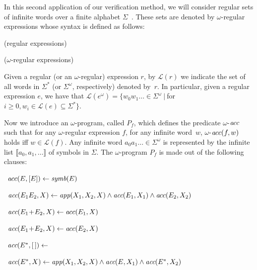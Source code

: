 \documentclass[english]{tlp}
\newcommand{\Mathit}[1]{\mbox{\it #1}}
\begin{document}
\begin{example}

In this second application of our verification method, we will consider
regular sets of infinite words over a finite alphabet $\Sigma$~\cite{Tho90}. 
These sets are
denoted by $\omega$-regular expressions whose syntax is defined as follows: 

\smallskip
{}(regular expressions)

\smallskip
{}($\omega$-regular expressions)

\smallskip
\noindent Given a regular (or an $\omega$-regular) expression $r$,
by $\mathcal L(r)$ we indicate the set of all words in $\Sigma^*$ 
(or $\Sigma^\omega$, respectively) denoted by~$r$.
In particular, given a regular expression $e$, we have that
$\mathcal L(e^\omega)=\{w_0w_1\ldots\in\Sigma^\omega\ |\ $for~$i\!\geq\! 0,
w_i\in\mathcal L(e)\!\subseteq\! \Sigma^*\}$.

Now we introduce an $\omega$-program, called
$P_f$, which defines the predicate $\omega$-${\Mathit acc}$ such
that for any $\omega$-regular expression $f$, for any infinite word~$w$,
\mbox{$\omega$-${\Mathit acc}(f,w)$} holds iff $w\in \mathcal L(f)$.
Any infinite word $a_0a_1\ldots\in\Sigma^\omega$ is represented by the infinite
list  $\llbracket a_0,a_1,\ldots\rrbracket$ of symbols in $\Sigma$. 
The $\omega$-program $P_f$ is made out of the following clauses:

\smallskip



~${\Mathit acc}(E,[E])\leftarrow
\Mathit{symb}(E)$

~${\Mathit{acc}}(E_1E_2,X) \leftarrow
\Mathit{app}(X_1,X_2,X)\wedge {\Mathit{acc}}(E_1,X_1)\wedge {\Mathit
acc}(E_2,X_2)$

~${\Mathit{acc}}(E_1\!+\!E_2,X) \leftarrow
{\Mathit acc}(E_1,X)$

~${\Mathit{acc}}(E_1\!+\!E_2,X) \leftarrow
{\Mathit acc}(E_2,X)$

~${\Mathit{acc}}(E^*,[\,])\leftarrow$

~${\Mathit{acc}}(E^*,X) \leftarrow
{\Mathit{app}}(X_1,X_2,X)\wedge {\Mathit{acc}}(E,X_1)\wedge
{\Mathit{acc}}(E^*,X_2)$




\end{example}
\end{document}
